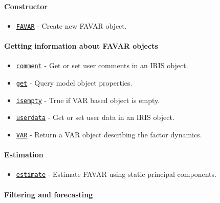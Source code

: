 

	\paragraph{Constructor}\label{constructor}

\begin{itemize}
\itemsep1pt\parskip0pt
\item
  \href{FAVAR/FAVAR}{\texttt{FAVAR}} - Create new FAVAR object.
\end{itemize}

\paragraph{Getting information about FAVAR
objects}\label{getting-information-about-favar-objects}

\begin{itemize}
\itemsep1pt\parskip0pt
\item
  \href{FAVAR/comment}{\texttt{comment}} - Get or set user comments in
  an IRIS object.
\item
  \href{FAVAR/get}{\texttt{get}} - Query model object properties.
\item
  \href{FAVAR/isempty}{\texttt{isempty}} - True if VAR based object is
  empty.
\item
  \href{FAVAR/userdata}{\texttt{userdata}} - Get or set user data in an
  IRIS object.
\item
  \href{FAVAR/VAR}{\texttt{VAR}} - Return a VAR object describing the
  factor dynamics.
\end{itemize}

\paragraph{Estimation}\label{estimation}

\begin{itemize}
\itemsep1pt\parskip0pt
\item
  \href{FAVAR/estimate}{\texttt{estimate}} - Estimate FAVAR using static
  principal components.
\end{itemize}

\paragraph{Filtering and forecasting}\label{filtering-and-forecasting}

